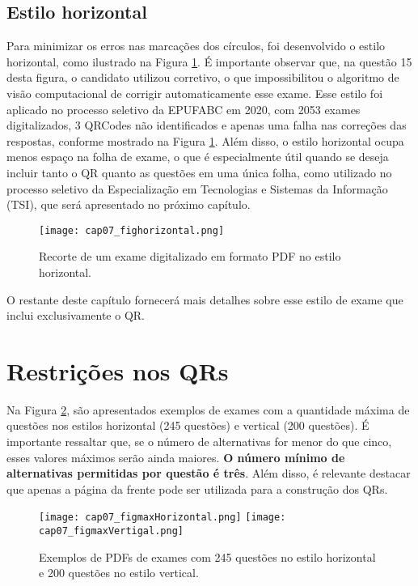 \subsection{Estilo horizontal}

Para minimizar os erros nas marcações dos círculos, foi desenvolvido o estilo horizontal, como ilustrado na Figura \ref{fig:cap07_fighorizontal}. É importante observar que, na questão 15 desta figura, o candidato utilizou corretivo, o que impossibilitou o algoritmo de visão computacional de corrigir automaticamente esse exame. Esse estilo foi aplicado no processo seletivo da EPUFABC em 2020, com 2053 exames digitalizados, 3 QRCodes não identificados e apenas uma falha nas correções das respostas, conforme mostrado na Figura \ref{fig:cap07_fighorizontal}. Além disso, o estilo horizontal ocupa menos espaço na folha de exame, o que é especialmente útil quando se deseja incluir tanto o QR quanto as questões em uma única folha, como utilizado no processo seletivo da Especialização em Tecnologias e Sistemas da Informação (TSI), que será apresentado no próximo capítulo.

\begin{figure}[htbp]
  \centering
  \texttt{[image: cap07\_fighorizontal.png]}
    \caption{Recorte de um exame digitalizado em formato PDF no estilo horizontal.}
 \label{fig:cap07_fighorizontal}
\end{figure}

O restante deste capítulo fornecerá mais detalhes sobre esse estilo de exame que inclui exclusivamente o QR.

\section{Restrições nos QRs}

Na Figura \ref{fig:cap07_figmaxVertigal}, são apresentados exemplos de exames com a quantidade máxima de questões nos estilos horizontal (245 questões) e vertical (200 questões). É importante ressaltar que, se o número de alternativas for menor do que cinco, esses valores máximos serão ainda maiores. \textbf{O número mínimo de alternativas permitidas por questão é três}. Além disso, é relevante destacar que apenas a página da frente pode ser utilizada para a construção dos QRs.


\begin{figure}[htbp]
\centering
\texttt{[image: cap07\_figmaxHorizontal.png]}
\texttt{[image: cap07\_figmaxVertigal.png]}
\caption{Exemplos de PDFs de exames com 245 questões no estilo horizontal e 200 questões no estilo vertical.}
\label{fig:cap07_figmaxVertigal}
\end{figure}

